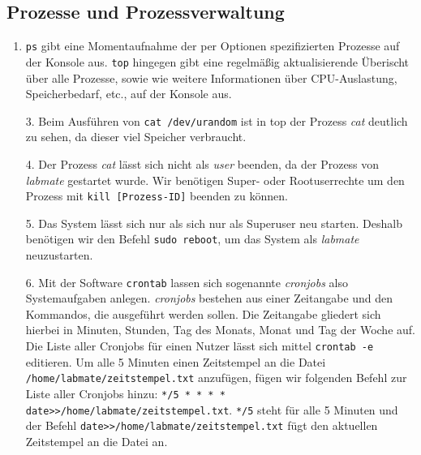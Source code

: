 \documentclass{scrartcl}
\begin{document}
    \subsection{Prozesse und Prozessverwaltung}
    \label{sub:Prozesse und Prozessverwaltung}

    \begin{enumerate} [1.]
      \item \texttt{ps} gibt eine Momentaufnahme der per Optionen spezifizierten Prozesse
            auf der Konsole aus. \texttt{top} hingegen gibt eine regelmäßig
            aktualisierende Überischt über alle Prozesse, sowie wie weitere
            Informationen über CPU-Auslastung, Speicherbedarf, etc., auf der Konsole
            aus.
      \item [3.] Beim Ausführen von \texttt{cat /dev/urandom} ist in top der Prozess
            \textit{cat} deutlich zu sehen, da dieser viel Speicher verbraucht.
      \item [4.] Der Prozess \textit{cat} lässt sich nicht als \textit{user} beenden,
            da der Prozess von \textit{labmate} gestartet wurde. Wir benötigen
            Super- oder Rootuserrechte um den Prozess mit \texttt{kill [Prozess-ID]}
            beenden zu können.
      \item [5.] Das System lässt sich nur als sich nur als Superuser neu starten.
            Deshalb benötigen wir den Befehl \texttt{sudo reboot}, um das System als
            \textit{labmate} neuzustarten.
      \item [6.] Mit der Software \texttt{crontab} lassen sich sogenannte \textit{cronjobs}
            also Systemaufgaben anlegen. \textit{cronjobs} bestehen aus einer
            Zeitangabe und den Kommandos, die ausgeführt werden sollen.
            Die Zeitangabe gliedert sich hierbei in Minuten, Stunden, Tag des Monats,
            Monat und Tag der Woche auf. Die Liste aller Cronjobs für einen Nutzer
            lässt sich mittel \texttt{crontab -e} editieren. Um alle 5 Minuten
            einen Zeitstempel an die Datei \texttt{/home/labmate/zeitstempel.txt}
            anzufügen, fügen wir folgenden Befehl zur Liste aller Cronjobs hinzu:
            \texttt{*/5 * * * * date>>/home/labmate/zeitstempel.txt}.
            \texttt{*/5} steht für alle 5 Minuten und der Befehl
            \texttt{date>>/home/labmate/zeitstempel.txt} fügt den aktuellen
            Zeitstempel an die Datei an.
    \end{enumerate}
\end{document}
